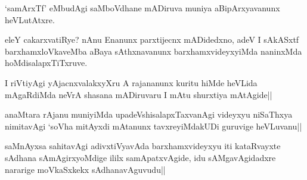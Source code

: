 \begin{artha}
`samArxTf' eMbudAgi saMboVdhane mADiruva muniya aBipArxyavanunx heVLutAtxre.
\end{artha}

\begin{artha}
eleY cakarxvatiRye? nAnu Enanunx parxtijecnx mADidedxno, adeV I sAkASxtf barxhamxloVkaveMba aBaya sAthxnavanunx barxhamxvideyxyiMda naninxMda hoMdisalapxTiTxruve.
\end{artha}


\begin{artha}
I riVtiyAgi yAjacnxvalakxyXru A rajananunx kuritu hiMde heVLida mAgaRdiMda neVrA shasana mADiruvaru I mAtu shurxtiya mAtAgide||
\end{artha}


\begin{artha}
anaMtara rAjanu muniyiMda upadeVshisalapxTaxvanAgi videyxyu niSaThxya nimitavAgi `soV\s ha mitAyxdi mAtanunx tavxreyiMdakUDi guruvige heVLuvanu||
\end{artha}


\begin{artha}
saMnAyxsa sahitavAgi adivxtiVyavAda barxhamxvideyxyu iti kataRvayxte sAdhana sAmAgirxyoMdige ililx samApatxvAgide, idu sAMgavAgidadxre nararige moVkaSxkekx sAdhanavAguvudu||
\end{artha}
